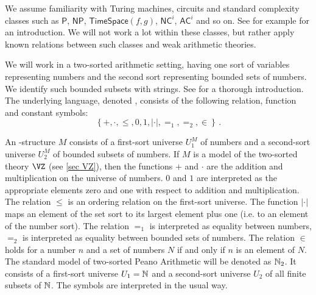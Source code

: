 \documentclass{LMCS}
\newcommand{\Nat}{\ensuremath \mathbb N}
\newcommand{\abs}[1]{\left\vert#1\right\vert}
\newcommand{\set}[1]{\left\{#1\right\}}
\newcommand {\cd}{\cdot}
\begin{document}
We assume familiarity with Turing machines, circuits and standard complexity classes such as $\mathsf{P}$,
$\mathsf{NP}$, $\mathsf{TimeSpace}(f,g)$, $\mathsf{NC}^i$, $\mathsf{AC}^i$ and so on. See for example
\cite{AB09} for an introduction. We will not work a lot within these classes, but rather apply known relations
between such classes and weak arithmetic theories.

We will work in a two-sorted arithmetic setting, having one sort of variables representing numbers and the
second sort representing bounded sets of numbers. We identify such bounded subsets with strings. See \cite{CN10}
for a thorough introduction. The underlying language, denoted \LTwoA, consists of the following relation,
function and constant symbols:\[ \set{+,\cd,\le, 0,1,\abs{\cdot},=_1,=_2,\in} \,.\]

An  \LTwoA-structure $M$ consists of a first-sort universe $U_1^M$ of numbers and a second-sort universe $U_2^M$
of bounded subsets of numbers.  If $M$ is a model of the two-sorted theory $\VZ$ (see \ref{sec VZ}), then the
functions $+$ and $\cd$ are the addition and multiplication on the universe of numbers. $0$ and $1$ are
interpreted as the appropriate elements zero and one with respect to addition and multiplication. The relation
$\le$ is an ordering relation on the first-sort universe. The function $\abs{\cdot }$ maps an element of the set
sort to its largest element plus one (i.e. to an element of the number sort). The relation $=_1$ is interpreted
as equality between numbers, $=_2$ is interpreted as equality between bounded sets of numbers. The relation
$\in$ holds for a number $n$ and a set of numbers $N$ if and only if $n$ is an element of $N$. The standard
model of two-sorted Peano Arithmetic will be denoted as $\Nat_2$. It consists of a first-sort universe
$U_1=\Nat$ and a second-sort universe $U_2$ of all finite subsets of $\Nat$. The symbols are interpreted in the
usual way.
\end{document}
